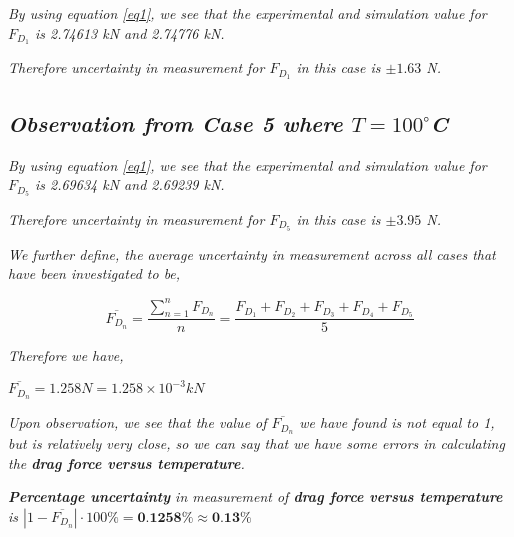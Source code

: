 	\textit{By using equation \ref{eq1}, we see that the experimental and simulation value for $F_{D_1}$ is 2.74613 kN and 2.74776 kN.}
        
	\textit{Therefore uncertainty in measurement for $F_{D_1}$ in this case is $\pm{\textit{1.63}}$ N.}
        
        
\subsection{\textit{Observation from Case 5 where $T = 100^\circ$C}}
        
	\textit{By using equation \ref{eq1}, we see that the experimental and simulation value for $F_{D_5}$ is 2.69634 kN and 2.69239 kN.}
        
	\textit{Therefore uncertainty in measurement for $F_{D_5}$ in this case is $\pm{\textit{3.95}}$ N.}
        

        

        




\textit{We further define, the average uncertainty in measurement across all cases that have been investigated to be,} 

    $$\overline{F_{D_n}} = \frac{\sum_{n=1}^{n}F_{D_n}}{n} = \frac{F_{D_1} + F_{D_2} + F_{D_3} + F_{D_4} + F_{D_5}}{5}$$

\textit{Therefore we have,}

    $\overline{F_{D_n}} = 1.258 N = 1.258\times 10^{-3} kN$

\textit{Upon observation, we see that the value of $\overline{F_{D_n}}$ we have found is not equal to 1, but is relatively very close, so we can say that we have some errors in calculating the \textbf{drag force versus temperature}.}
        
        \textit{\textbf{Percentage uncertainty} in measurement of \textbf{drag force versus temperature} is $\left|1-\overline{F_{D_n}}\right|\cdot{100\%} = \textbf{0.1258\%} \approx \textbf{0.13\%}$}
        



